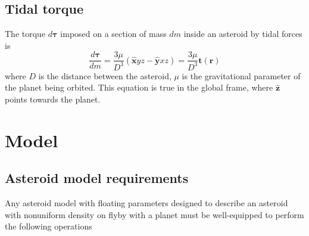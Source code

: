 \documentclass[aps,twocolumn,secnumarabic,balancelastpage,amsmath,amssymb,nofootinbib,floatfix]{revtex4-1}
\begin{document}
\subsection{Tidal torque}
The torque $d\bm{\tau}$ imposed on a section of mass $dm$ inside an asteroid by tidal forces is
\begin{equation}
    \frac{d\bm{\tau}}{dm} =\frac{3\mu}{D^3} (\bm{\hat x} yz - \bm{\hat y} xz) = \frac{3\mu}{D^3} \bm{t}(\bm{r})
    \label{eqn:diff-torque}
\end{equation}
where $D$ is the distance between the asteroid, $\mu$ is the gravitational parameter of the planet being orbited. This equation is true in the global frame, where $\hat{\bm z}$ points towards the planet.

\section{Model}
\subsection{Asteroid model requirements}
\label{sec:requirements}
Any asteroid model with floating parameters designed to describe an asteroid with nonuniform density on flyby with a planet must be well-equipped to perform the following operations
\end{document}
